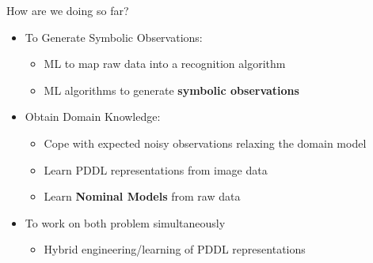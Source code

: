 \documentclass[usenames,dvipsnames]{beamer}
\begin{document}

\begin{frame}[c]{How are we doing so far?}
	\begin{itemize}
		\item To Generate Symbolic Observations:
		\begin{itemize}
			\item ML to map raw data into a recognition algorithm {\Large \color{red} \checkmark}
			\item ML algorithms to generate \textbf{symbolic observations}
		\end{itemize}
		\item Obtain Domain Knowledge:
		\begin{itemize}
			\item Cope with expected noisy observations relaxing the domain model
			\item Learn PDDL representations from image data
			\item Learn \textbf{Nominal Models} from raw data
		\end{itemize}
		\item To work on both problem simultaneously
		\begin{itemize}
			\item Hybrid engineering/learning of PDDL representations 
		\end{itemize}
	\end{itemize}
\end{frame}
\end{document}
